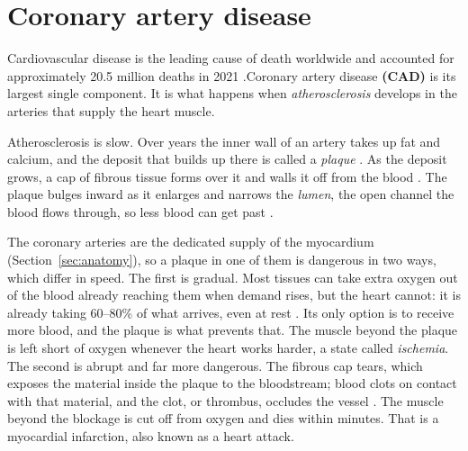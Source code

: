 %
%

\section{Coronary artery disease}
\label{sec:cad}

Cardiovascular disease is the leading cause of death worldwide and accounted for approximately
20.5 million deaths in 2021 \cite{lindstrom2022global}.Coronary artery disease \textbf{ (CAD)} is its largest single component.
It is what happens when \emph{atherosclerosis} develops in the arteries that supply the heart
muscle.

Atherosclerosis is slow.
Over years the inner wall of an artery takes up fat and calcium, and the deposit that builds up
there is called a \emph{plaque} \cite{libby2019atherosclerosis}.
As the deposit grows, a cap of fibrous tissue forms over it and walls it off from the blood
\cite{libby2019atherosclerosis}.
The plaque bulges inward as it enlarges and narrows the \emph{lumen}, the open channel the blood
flows through, so less blood can get past \cite{libby2019atherosclerosis}.

The coronary arteries are the dedicated supply of the myocardium (Section~\ref{sec:anatomy}), so a plaque in one of them is dangerous in two ways, which differ in speed. 
The first is gradual. Most tissues can take extra oxygen out of the blood already reaching them when demand rises, but
the heart cannot: it is already taking 60--80\% of what arrives, even at rest
\cite{duncker2015regulation}. Its only option is to receive more blood, and the plaque is what prevents that. The muscle beyond the plaque is left short of oxygen whenever the heart works harder, a state
called \emph{ischemia}.
The second is abrupt and far more dangerous. The fibrous cap tears, which
exposes the material inside the plaque to the bloodstream; blood clots on contact with that
material, and the clot, or thrombus, occludes the vessel \cite{rampidis2022geometry}. The muscle beyond the blockage is cut off from oxygen and dies within minutes. That is a myocardial infarction, also known as a heart attack.

